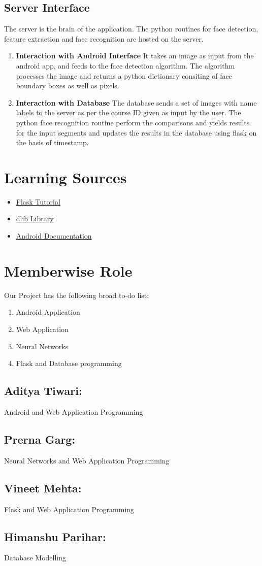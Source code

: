 \documentclass{article}
\begin{document}
\subsection{Server Interface} The server is the brain of the application. The python routines for face detection, feature extraction and face recognition are hosted on the server.
\begin{enumerate}
\item \textbf{Interaction with Android Interface} 
It takes an image as input from the android app, and feeds to the face detection algorithm. The algorithm processes the image and returns a python dictionary consiting of face boundary boxes as well as pixels. 
\item \textbf{Interaction with Database} The database sends a set of images with name labels to the server as per the course ID given as input by the user. The python face recognition routine perform the comparisons and yields results for the input segments and updates the results in the database using flask on the basis of timestamp.
\end{enumerate}
\newpage

\section{Learning Sources}
\begin{itemize}
\color{blue}
\item \href{https://www.youtube.com/watch?v=zRwy8gtgJ1A}{Flask Tutorial}
\item \href{http://dlib.net/}{dlib Library}
\item \href{https://developer.android.com/training/camera/photobasics.html}{Android Documentation}
\end{itemize}

\section{Memberwise Role}
Our Project has the following broad to-do list:
\begin{enumerate}
\item Android Application
\item Web Application
\item Neural Networks
\item Flask and Database programming
\end{enumerate}
\subsection{Aditya Tiwari:} Android and Web Application Programming
\subsection{Prerna Garg:} Neural Networks and Web Application Programming
\subsection{Vineet Mehta:} Flask and Web Application Programming
\subsection{Himanshu Parihar:} Database Modelling
\end{document}
